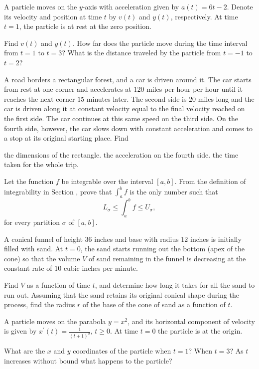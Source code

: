 \begin{exercises}
A particle moves on the $y$-axis with acceleration
given by $a(t) = 6t - 2$.
Denote its velocity and position at time $t$ by $v(t)$
and $y(t)$, respectively.
At time $t = 1$, the particle is at rest at the zero
position.
\begin{exenum}
\x
Find $v(t)$ and $y(t)$.
\x
How far does the particle move during the
time interval from $t = 1$ to $t = 3$?
\x
What is the distance traveled by the particle
from $t = -1$ to $t = 2$?
\end{exenum}

A road borders a rectangular forest,
and a car is driven around it.
The car starts from rest at one corner and accelerates
at $120$ miles per hour per hour until it reaches
the next corner $15$ minutes later.
The second side is $20$ miles long and the
car is driven along it at constant velocity
equal to the final velocity reached on the first side.
The car continues at this same speed on the third side.
On the fourth side, however, the car slows down
with constant acceleration and comes to a stop
at its original starting place.  Find
\begin{exenum}
\x
the dimensions of the rectangle.
\x
the acceleration on the fourth side.
\x
the time taken for the whole trip.
\end{exenum}

Let the function $f$ be integrable over the interval
$[a,b]$.  From the definition of integrability in Section
, prove that $\int_a^b f$ is the only
number such that
\[
L_\sigma \leq \int_a^b f \leq U_\sigma
,
\]
for every partition $\sigma$ of $[a,b]$.

A conical funnel of height $36$ inches and base
with radius $12$ inches is initially filled with sand.
At $t = 0$, the sand starts running out the bottom
(apex of the cone) so that the volume $V$ of sand
remaining in the funnel is decreasing at the constant
rate of $10$ cubic inches per minute.
\begin{exenum}
\x
Find $V$ as a function of time $t$, and determine
how long it takes for all the sand to run out.
\x
Assuming that the sand retains its original conical
shape during the process, find the radius $r$
of the base of the cone of sand as a function of $t$.
\end{exenum}

A particle moves on the parabola $y = x^2$,
and its horizontal component of velocity is given
by $x^\prime (t) = \frac1{(t + 1)^2}$, $t \geq 0$.
At time $t = 0$ the particle is at the origin.
\begin{exenum}
\x
What are the $x$ and $y$ coordinates of the particle
when $t = 1$?
When $t = 3$?
\x
As $t$ increases without bound what happens
to the particle?
\end{exenum}


\end{exercises}
